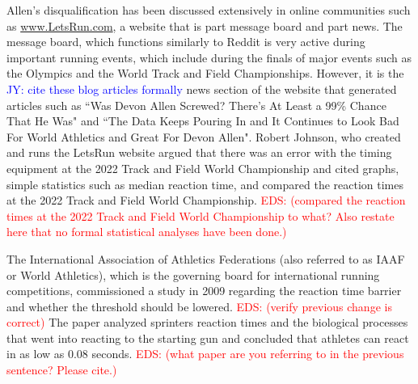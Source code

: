 \documentclass[12pt, letterpaper, titlepage]{article}
\newcommand{\jy}[1]{\textcolor{blue}{JY: #1}}
\newcommand{\eds}[1]{\textcolor{red}{EDS: (#1)}}
\begin{document}
Allen's disqualification has been discussed extensively in online communities
such as \url{www.LetsRun.com}, a website that is part message board and part
news. The message board,
which functions similarly to Reddit is very active during important running
events, which include during the finals of major events such as
the Olympics and the World Track and Field Championships.  However, it is the
\jy{cite these blog articles formally}
news section of the website that generated articles such as ``Was Devon Allen
Screwed? There's At Least a 99\% Chance That He Was" and ``The Data Keeps Pouring 
In and
It Continues to Look Bad For World Athletics and Great For Devon Allen".  Robert
Johnson, who created and runs the LetsRun website argued that there was an error
with the timing equipment at the 2022 Track and Field World Championship and
cited graphs, simple statistics such as median reaction time, and compared the 
reaction times at the 2022 Track and Field World Championship. 
\eds{compared the reaction times at the 2022 Track and Field World Championship 
to what? Also restate here that no formal statistical analyses have been done.}

The International Association of Athletics Federations (also referred to
as IAAF or World Athletics), which is the governing board for international running
competitions, commissioned a study in 2009 regarding the reaction time 
barrier and whether the threshold should be lowered. 
\eds{verify previous change is correct} 
The paper analyzed sprinters reaction times and the biological processes 
that went into reacting to the starting gun and concluded 
that athletes can react in as low as 0.08 seconds.  
\eds{what paper are you referring to in the previous sentence?  Please cite.} 
\end{document}
